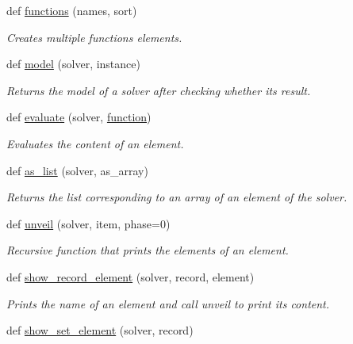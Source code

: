 \begin{DoxyCompactItemize}
def \hyperlink{namespacemeyer_1_1util_1_1z3py__util_a6cf5a3dfdff69d332f989d1b8f73119b}{functions} (names, sort)
\begin{DoxyCompactList}\small\item\em Creates multiple functions elements. \end{DoxyCompactList}\item 
def \hyperlink{namespacemeyer_1_1util_1_1z3py__util_a8512b24ebe7ccd137b53ba52407415fb}{model} (solver, instance)
\begin{DoxyCompactList}\small\item\em Returns the model of a solver after checking whether its result. \end{DoxyCompactList}\item 
def \hyperlink{namespacemeyer_1_1util_1_1z3py__util_ad469c85dd6ea1c5d3641446ea0246166}{evaluate} (solver, \hyperlink{namespacemeyer_1_1util_1_1z3py__util_a347859270b8ef0d7bb63d7840aa5f4aa}{function})
\begin{DoxyCompactList}\small\item\em Evaluates the content of an element. \end{DoxyCompactList}\item 
def \hyperlink{namespacemeyer_1_1util_1_1z3py__util_a88b1476f6b8d614eb1907a94d711f40d}{as\+\_\+list} (solver, as\+\_\+array)
\begin{DoxyCompactList}\small\item\em Returns the list corresponding to an array of an element of the solver. \end{DoxyCompactList}\item 
def \hyperlink{namespacemeyer_1_1util_1_1z3py__util_a4eea2be8cfebc20260a595ef0152781c}{unveil} (solver, item, phase=0)
\begin{DoxyCompactList}\small\item\em Recursive function that prints the elements of an element. \end{DoxyCompactList}\item 
def \hyperlink{namespacemeyer_1_1util_1_1z3py__util_a94d6ccd0151825f3405c1ebccf8532b9}{show\+\_\+record\+\_\+element} (solver, record, element)
\begin{DoxyCompactList}\small\item\em Prints the name of an element and call unveil to print its content. \end{DoxyCompactList}\item 
def \hyperlink{namespacemeyer_1_1util_1_1z3py__util_a95c84051003c44372826c0350d2d4042}{show\+\_\+set\+\_\+element} (solver, record)

\end{DoxyCompactItemize}
